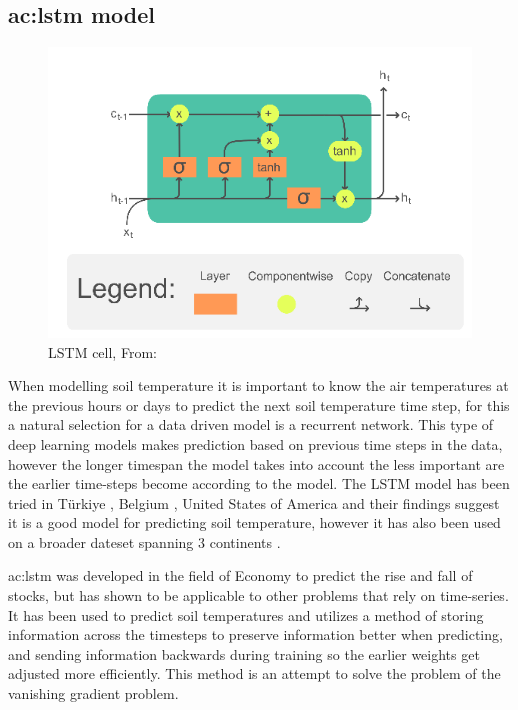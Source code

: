 \subsection{\acrfull{ac:lstm} model}\label{sec:theory:lstm}

\begin{figure}[ht]
	\centering
	\includegraphics[width=0.7\linewidth]{figures/LSTM_Cell}
	\caption{LSTM cell,  From: \textcite{chevalier_english_2018}}
	\label{fig:lstmcell}
\end{figure}
When modelling soil temperature it is important to know the air temperatures at the previous hours or days to predict the next soil temperature time step, for this a natural selection for a data driven model is a recurrent network. This type of deep learning models makes prediction based on previous time steps in the data, however the longer timespan the model takes into account the less important are the earlier time-steps become according to the model. The LSTM model has been tried in Türkiye \cite{uluocak_daily_2024}, Belgium \cite{elmaz_cnn-lstm_2021}, United States of America \cite{li_modeling_2020} and their findings suggest it is a good model for predicting soil temperature, however it has also been used on a broader dateset spanning 3 continents \cite{li_attention-aware_2022}.

\acrshort{ac:lstm}\cite{hochreiter_long_1997} was developed in the field of Economy to predict the rise and fall of stocks, but has shown to be applicable to other problems that rely on time-series. It has been used to predict soil temperatures\cite{citakoglu_comparison_2017,elmaz_cnn-lstm_2021,feng_estimation_2019,kandasamy_performance_2023,li_attention-aware_2022,li_gans-lstm_2020,li_modeling_2020,wang_modeling_2022,mehdizadeh_modelling_2020} and utilizes a method of storing information across the timesteps to preserve information better when predicting, and sending information backwards during training so the earlier weights get adjusted more efficiently. This method is an attempt to solve the problem of the vanishing gradient problem.

